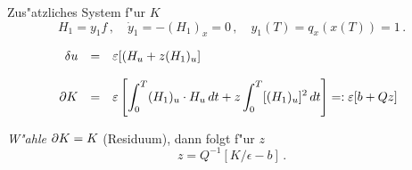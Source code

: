 \documentclass[12pt,a4paper,twoside,leqno]{article}
\begin{document}
Zus"atzliches System f"ur $K$
\[
H_1 = y_1f\,, \quad \dot{y}_1 = -(H_1)_x = 0\,,
\quad y_1(T) = q_x(x(T)) = 1\,.
\]

\[
\ba{.}{rcl}
\delta u &=& \dis \epsilon [(H_u + z (H_1)_u]\\[4mm]
\da K &=& \dis
\epsilon \left[\int_0^T (H_1)_u \cdot H_u\, dt
+ z \int_0^T [(H_1)_u]^2\, dt\right] =: \epsilon [b + Qz]
\ea{.}
\]

{\em W"ahle}  $\da K = K$ (Residuum), dann folgt f"ur $z$
\[
z = Q^{-1}[K/\epsilon  - b]\, .
\]

\end{document}
